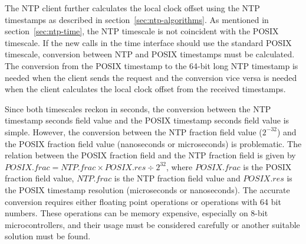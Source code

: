 The NTP client further calculates the local clock offset using the NTP timestamps
as described in section~\ref{sec:ntp-algorithms}.
As mentioned in section~\ref{sec:ntp-time}, the NTP timescale is not
coincident with the POSIX timescale.
If the new calls in the time interface should use the standard POSIX timescale,
conversion between NTP and POSIX timestamps must be calculated.
The conversion from the POSIX timestamp to the 64-bit long NTP timestamp
is needed when the client sends the request
and the conversion vice versa is needed when the client calculates
the local clock offset from the received timestamps.

Since both timescales reckon in seconds, the conversion between
the NTP timestamp seconds field value and the POSIX timestamp seconds field value is simple.
However, the conversion between the NTP fraction field value ($2^{-32}$)
and the POSIX fraction field value (nanoseconds or microseconds) is problematic.
The relation between the POSIX fraction field and the NTP fraction field
is given by $POSIX.frac = NTP.frac \times POSIX.res \div 2^{32}$,
where $POSIX.frac$ is the POSIX fraction field value,
$NTP.frac$ is the NTP fraction field value and
$POSIX.res$ is the POSIX timestamp resolution (microseconds or nanoseconds).
The accurate conversion requires either floating point operations or operations with 64 bit numbers.
These operations can be memory expensive, especially on 8-bit microcontrollers,
and their usage must be considered carefully or another suitable solution must be found.
